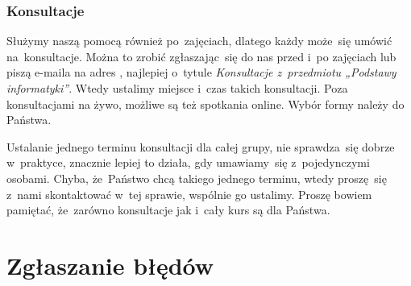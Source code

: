\documentclass[10pt,t]{beamer}
\begin{document}
\begin{frame}
  \frametitle{Konsultacje}


  Służymy naszą pomocą również po~zajęciach, dlatego każdy może~się umówić
  na~konsultacje. Można to zrobić zgłaszając~się do nas przed i~po
  zajęciach lub piszą e-maila na adres \email, najlepiej o~tytule
  \textit{Konsultacje z~przedmiotu „Podstawy informatyki”}. Wtedy ustalimy
  miejsce i~czas takich konsultacji. Poza konsultacjami na żywo, możliwe są
  też spotkania online. Wybór formy należy do Państwa.

  Ustalanie jednego terminu konsultacji dla całej grupy, nie sprawdza~się
  dobrze w~praktyce, znacznie lepiej to działa, gdy umawiamy~się
  z~pojedynczymi osobami. Chyba, że~Państwo chcą takiego jednego terminu,
  wtedy proszę~się z~nami skontaktować w~tej sprawie, wspólnie go ustalimy.
  Proszę bowiem pamiętać, że~zarówno konsultacje jak i~cały kurs są dla
  Państwa.

\end{frame}




















\section{Zgłaszanie błędów}
\end{document}

